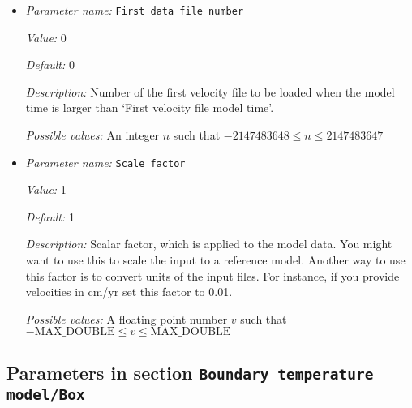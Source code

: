 \begin{itemize}
{\it Possible values:} A floating point number $v$ such that $0 \leq v \leq \text{MAX\_DOUBLE}$
\item {\it Parameter name:} {\tt First data file number}
\label{parameters:Boundary temperature model/Ascii data model/First data file number}
\label{parameters:Boundary_20temperature_20model/Ascii_20data_20model/First_20data_20file_20number}


{\it Value:} 0


{\it Default:} 0


{\it Description:} Number of the first velocity file to be loaded when the model time is larger than `First velocity file model time'.


{\it Possible values:} An integer $n$ such that $-2147483648\leq n \leq 2147483647$
\item {\it Parameter name:} {\tt Scale factor}
\label{parameters:Boundary temperature model/Ascii data model/Scale factor}
\label{parameters:Boundary_20temperature_20model/Ascii_20data_20model/Scale_20factor}


{\it Value:} 1


{\it Default:} 1


{\it Description:} Scalar factor, which is applied to the model data. You might want to use this to scale the input to a reference model. Another way to use this factor is to convert units of the input files. For instance, if you provide velocities in cm/yr set this factor to 0.01.


{\it Possible values:} A floating point number $v$ such that $-\text{MAX\_DOUBLE} \leq v \leq \text{MAX\_DOUBLE}$
\end{itemize}

\subsection{Parameters in section \tt Boundary temperature model/Box}
\label{parameters:Boundary_20temperature_20model/Box}

